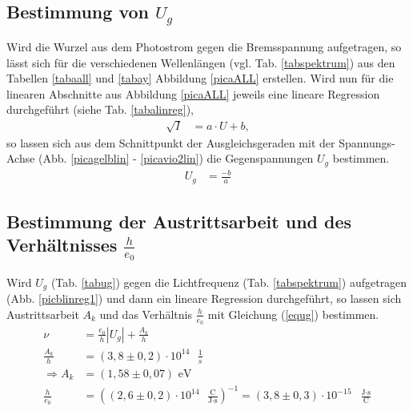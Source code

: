 
\subsection{Bestimmung von $U_g$} %
   
    
 
Wird die Wurzel aus dem Photostrom gegen die Bremsspannung aufgetragen, so lässt sich
für die verschiedenen Wellenlängen (vgl. Tab. \ref{tabspektrum}) aus den Tabellen \ref{tabaall} und \ref{tabay} Abbildung \ref{picaALL}
erstellen. Wird nun für die linearen Abschnitte aus Abbildung \ref{picaALL} jeweils eine lineare 
Regression \cite{linreg} durchgeführt (siehe Tab. \ref{tabalinreg}), 
\begin{align}
\sqrt{I}&=a\cdot U+b,
\end{align}
so lassen
sich aus dem Schnittpunkt der Ausgleichsgeraden mit der Spannungs-Achse (Abb. \ref{picagelblin} - 
\ref{picavio2lin}) die Gegenspannungen $U_g$ bestimmen.
\begin{align}
U_g&=\frac{-b}{a}
\end{align}

\subsection{Bestimmung der Austrittsarbeit und des Verhältnisses $\frac{h}{e_0}$}

Wird $U_g$ (Tab. \ref{tabug}) gegen die Lichtfrequenz (Tab. \ref{tabspektrum}) aufgetragen 
(Abb. \ref{picblinreg1}) und dann ein lineare Regression \cite{linreg} durchgeführt, so 
lassen sich Austrittsarbeit $A_k$ und das Verhältnis $\frac{h}{e_0}$ mit Gleichung (\ref{equg}) 
bestimmen.
\begin{align}
\nu &= \frac{e_0}{h} |U_g| + \frac{A_k}{h}\\
\frac{A_k}{h}&=(3,8\pm0,2)\cdot10^{14}\text{ }\frac{1}{s}\\
\Rightarrow A_k&=(1,58\pm0,07)\text{ eV}\\
\frac{h}{e_0}&=((2,6 \pm 0,2)\cdot 10^{14} \text{ } \frac{\text{C}}{\text{J}\cdot \text{s}})^{-1}=(3,8\pm0,3)\cdot10^{-15}\text{ }\frac{\text{J$\cdot$s}}{\text{C}}
\end{align}


